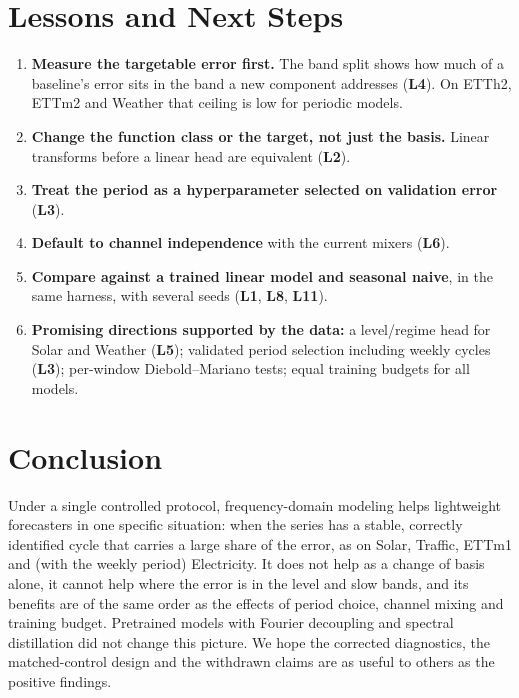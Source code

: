 \documentclass[11pt,a4paper]{article}
\newcommand{\lrn}[1]{\textbf{L#1}}
\begin{document}
\section{Lessons and Next Steps}
\label{sec:lessons}
\begin{enumerate}
    \item \textbf{Measure the targetable error first.} The band split shows how much of a baseline's error sits in the band a new component addresses (\lrn{4}). On ETTh2, ETTm2 and Weather that ceiling is low for periodic models.
    \item \textbf{Change the function class or the target, not just the basis.} Linear transforms before a linear head are equivalent (\lrn{2}).
    \item \textbf{Treat the period as a hyperparameter selected on validation error} (\lrn{3}).
    \item \textbf{Default to channel independence} with the current mixers (\lrn{6}).
    \item \textbf{Compare against a trained linear model and seasonal naive}, in the same harness, with several seeds (\lrn{1}, \lrn{8}, \lrn{11}).
    \item \textbf{Promising directions supported by the data:} a level/regime head for Solar and Weather (\lrn{5}); validated period selection including weekly cycles (\lrn{3}); per-window Diebold--Mariano tests; equal training budgets for all models.
\end{enumerate}

\section{Conclusion}
Under a single controlled protocol, frequency-domain modeling helps lightweight forecasters in one specific situation: when the series has a stable, correctly identified cycle that carries a large share of the error, as on Solar, Traffic, ETTm1 and (with the weekly period) Electricity. It does not help as a change of basis alone, it cannot help where the error is in the level and slow bands, and its benefits are of the same order as the effects of period choice, channel mixing and training budget. Pretrained models with Fourier decoupling and spectral distillation did not change this picture. We hope the corrected diagnostics, the matched-control design and the withdrawn claims are as useful to others as the positive findings.



\end{document}
